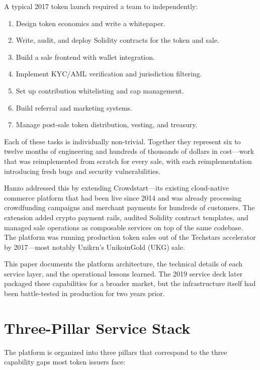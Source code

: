\documentclass[11pt,letterpaper]{article}
\begin{document}
A typical 2017 token launch required a team to independently:

\begin{enumerate}[leftmargin=1.2em]
    \item Design token economics and write a whitepaper.
    \item Write, audit, and deploy Solidity contracts for the token and sale.
    \item Build a sale frontend with wallet integration.
    \item Implement KYC/AML verification and jurisdiction filtering.
    \item Set up contribution whitelisting and cap management.
    \item Build referral and marketing systems.
    \item Manage post-sale token distribution, vesting, and treasury.
\end{enumerate}

Each of these tasks is individually non-trivial. Together they represent six to
twelve months of engineering and hundreds of thousands of dollars in cost---work
that was reimplemented from scratch for every sale, with each reimplementation
introducing fresh bugs and security vulnerabilities.

Hanzo addressed this by extending Crowdstart---its existing cloud-native
commerce platform that had been live since 2014 and was already processing
crowdfunding campaigns and merchant payments for hundreds of customers. The
extension added crypto payment rails, audited Solidity contract templates,
and managed sale operations as composable services on top of the same
codebase. The platform was running production token sales out of the
Techstars accelerator by 2017---most notably Unikrn's UnikoinGold (UKG) sale.

This paper documents the platform architecture, the technical details of each
service layer, and the operational lessons learned. The 2019 service deck
later packaged these capabilities for a broader market, but the infrastructure
itself had been battle-tested in production for two years prior.

\section{Three-Pillar Service Stack}
\label{sec:pillars}

The platform is organized into three pillars that correspond to the three
capability gaps most token issuers face:
\end{document}
